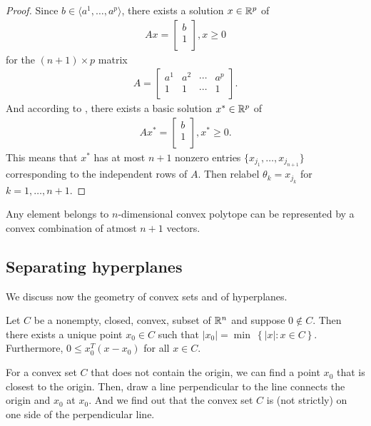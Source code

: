 \begin{proof}
Since $b \in \langle a^1, \dots, a^p \rangle$, there exists a solution $x \in \mathbb{R}^p$ of 
\begin{align}
A x = \begin{bmatrix}
b \\
1 \\
\end{bmatrix},
x \ge 0
\end{align}
for the $(n+1) \times p$ matrix 
\begin{align}
A = \begin{bmatrix}
a^1 & a^2 & \cdots & a^p \\
1   & 1   & \cdots & 1   \\
\end{bmatrix}.
\end{align}
And according to , there exists a basic solution $x^* \in \mathbb{R}^p$ of 
\begin{align}
A x^* = \begin{bmatrix}
b \\
1 \\
\end{bmatrix},
x^* \ge 0.
\end{align}
This means that $x^*$ has at most $n+1$ nonzero entries $\{ x_{j_1}, \dots, x_{j_{n+1}} \}$ corresponding to the independent rows of $A$.
Then relabel $\theta_k = x_{j_k}$ for $k = 1, \dots, n+1$.
\end{proof}

Any element belongs to $n$-dimensional convex polytope can be represented by a convex combination of atmost $n+1$ vectors. 

\subsection{Separating hyperplanes}

We discuss now the geometry of convex sets and of hyperplanes. 

\begin{lemma}
Let $C$ be a nonempty, closed, convex, subset of $\mathbb{R}^n$ and suppose $0 \notin C$. 
Then there exists a unique point $x_0 \in C$ such that $|x_0| = \min \ \left\{ |x| : x \in C \right\}$.
Furthermore, $0 \le x_0 ^T (x-x_0)$ for all $x \in C$.
\end{lemma}

For a convex set $C$ that does not contain the origin, we can find a point $x_0$ that is closest to the origin. 
Then, draw a line perpendicular to the line connects the origin and $x_0$ at $x_0$.
And we find out that the convex set $C$ is (not strictly) on one side of the perpendicular line.


